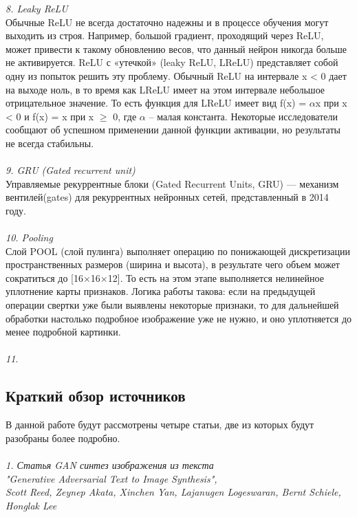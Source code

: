 \documentclass{article}
\begin{document}
    \textit{8. Leaky ReLU}
    \\
    Обычные ReLU не всегда достаточно надежны и в процессе обучения могут выходить из строя. Например, большой градиент, проходящий через ReLU, может привести к такому обновлению весов, что данный нейрон никогда больше не активируется. 
    ReLU с «утечкой» (leaky ReLU, LReLU) представляет собой одну из попыток решить эту проблему. Обычный ReLU на интервале x < 0 дает на выходе ноль, в то время как LReLU имеет на этом интервале небольшое отрицательное значение. То есть функция для LReLU имеет вид  f(x) = $\alpha$x при x < 0 и f(x) = x при x $\geqslant$ 0, где $\alpha$ – малая константа. Некоторые исследователи сообщают об успешном применении данной функции активации, но результаты не всегда стабильны.
    \\ \\
    \textit{9. GRU (Gated recurrent unit)}
    \\
    Управляемые рекуррентные блоки (Gated Recurrent Units, GRU) — механизм вентилей(gates) для рекуррентных нейронных сетей, представленный в 2014 году. 
    \\ \\
    \textit{10. Pooling}
    \\
    Слой POOL (слой пулинга) выполняет операцию по понижающей дискретизации пространственных размеров (ширина и высота), в результате чего объем может сократиться до [16×16×12]. То есть на этом этапе выполняется нелинейное уплотнение карты признаков. Логика работы такова: если на предыдущей операции свертки уже были выявлены некоторые признаки, то для дальнейшей обработки настолько подробное изображение уже не нужно, и оно уплотняется до менее подробной картинки.
    \\ \\
    \textit{11. }
    \newpage
    \begin{center} 
    \section{Краткий обзор источников}
    \end{center}
    \large 
    В данной работе будут рассмотрены четыре статьи, две из которых будут разобраны более подробно.
    \\ \\
    \textit{1. Статья GAN синтез изображения из текста
    \\
    "Generative Adversarial Text to Image Synthesis", 
    \\
    Scott Reed, Zeynep Akata, Xinchen Yan, Lajanugen Logeswaran, Bernt Schiele, Honglak Lee}
    \\
\end{document}
